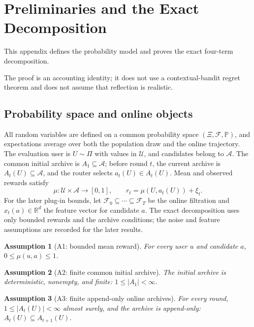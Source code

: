 \documentclass{article} %
\newtheorem{assumption}{Assumption}
\begin{document}
\section{Preliminaries and the Exact Decomposition}

\label{app:proofs}

This appendix defines the probability model and proves the exact four-term decomposition.

The proof is an accounting identity; it does not use a contextual-bandit regret theorem and does not assume that reflection is realistic.

\subsection{Probability space and online objects}

All random variables are defined on a common probability space
\((\Xi,\mathcal F,\mathbb P)\), and expectations average over both the
population draw and the online trajectory.  The evaluation user is
\(U\sim\Pi\) with values in \(\mathcal U\), and candidates belong to
\(\mathcal A\).  The common initial archive is \(A_1\subseteq\mathcal A\);
before round \(t\), the current archive is \(A_t(U)\subseteq\mathcal A\), and
the router selects \(a_t(U)\in A_t(U)\).  Mean and observed rewards satisfy
\begin{equation}
\mu:\mathcal U\times\mathcal A\to[0,1],
\qquad
r_t=\mu(U,a_t(U))+\xi_t.
\end{equation}
For the later plug-in bounds, let
\(\mathcal F_0\subseteq\cdots\subseteq\mathcal F_T\) be the online filtration
and \(x_t(a)\in\mathbb R^d\) the feature vector for candidate \(a\).  The exact
decomposition uses only bounded rewards and the archive conditions; the noise
and feature assumptions are recorded for the later results.

\begin{assumption}[A1: bounded mean reward]
\label{ass:app-bounded}
For every user \(u\) and candidate \(a\),
\(0\leq\mu(u,a)\leq 1\).
\end{assumption}

\begin{assumption}[A2: finite common initial archive]
\label{ass:app-finite-initial}
The initial archive is deterministic, nonempty, and finite:
\(1\leq |A_1|<\infty\).
\end{assumption}

\begin{assumption}[A3: finite append-only online archives]
\label{ass:app-append-only}
For every round, \(1\leq |A_t(U)|<\infty\) almost surely, and the archive is
append-only: \(A_t(U)\subseteq A_{t+1}(U)\).
\end{assumption}
\end{document}
